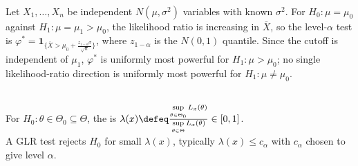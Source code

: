 \begin{example} \label{ex:normal-mean-np-one-sided-known-variance} \\
Let $X_1,\ldots,X_n$ be independent $N(\mu,\sigma^2)$ variables with known $\sigma^2$. For $H_0:\mu=\mu_0$ against $H_1:\mu=\mu_1>\mu_0$, the likelihood ratio is increasing in $\overline{X}$, so the level-$\alpha$ test is $\varphi^\ast=\mathbf{1}_{\{\overline{X}>\mu_0+\frac{z_{1-\alpha}\sigma}{\sqrt n}\}}$, where $z_{1-\alpha}$ is the $N(0,1)$ quantile. Since the cutoff is independent of $\mu_1$, $\varphi^\ast$ is uniformly most powerful for $H_1:\mu>\mu_0$; no single likelihood-ratio direction is uniformly most powerful for $H_1:\mu\neq\mu_0$.
\end{example}

\begin{definition} \label{def:generalized-likelihood-ratio-test} \\
For $H_0:\theta\in\Theta_0\subseteq\Theta$, the  is $\lambda(x)\defeq\frac{\sup\limits_{\theta\in\Theta_0}L_x(\theta)}{\sup\limits_{\theta\in\Theta}L_x(\theta)}\in[0,1]$.\\
A GLR test rejects $H_0$ for small $\lambda(x)$, typically $\lambda(x)\leq c_\alpha$ with $c_\alpha$ chosen to give level $\alpha$.
\end{definition}

